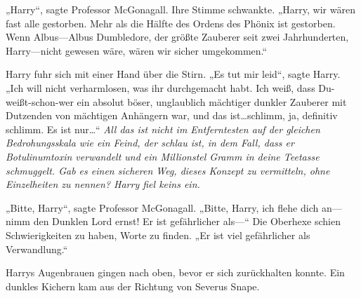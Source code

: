 „Harry“, sagte Professor McGonagall. Ihre Stimme schwankte. „Harry, wir wären fast alle gestorben. Mehr als die Hälfte des Ordens des Phönix ist gestorben. Wenn Albus—Albus Dumbledore, der größte Zauberer seit zwei Jahrhunderten, Harry—nicht gewesen wäre, wären wir sicher umgekommen.“

Harry fuhr sich mit einer Hand über die Stirn. „Es tut mir leid“, sagte Harry. „Ich will nicht verharmlosen, was ihr durchgemacht habt. Ich weiß, dass Du-weißt-schon-wer ein absolut böser, unglaublich mächtiger dunkler Zauberer mit Dutzenden von mächtigen Anhängern war, und das ist…schlimm, ja, definitiv schlimm. Es ist nur…“ \emph{All das ist nicht im Entferntesten auf der gleichen Bedrohungsskala wie ein Feind, der schlau ist, in dem Fall, dass er Botulinumtoxin verwandelt und ein Millionstel Gramm in deine Teetasse schmuggelt. Gab es einen sicheren Weg, dieses Konzept zu vermitteln, ohne Einzelheiten zu nennen? Harry fiel keins ein.}

„Bitte, Harry“, sagte Professor McGonagall. „Bitte, Harry, ich flehe dich an—nimm den Dunklen Lord ernst! Er ist gefährlicher als—“ Die Oberhexe schien Schwierigkeiten zu haben, Worte zu finden. „Er ist viel gefährlicher als Verwandlung.“

Harrys Augenbrauen gingen nach oben, bevor er sich zurückhalten konnte. Ein dunkles Kichern kam aus der Richtung von Severus Snape.


